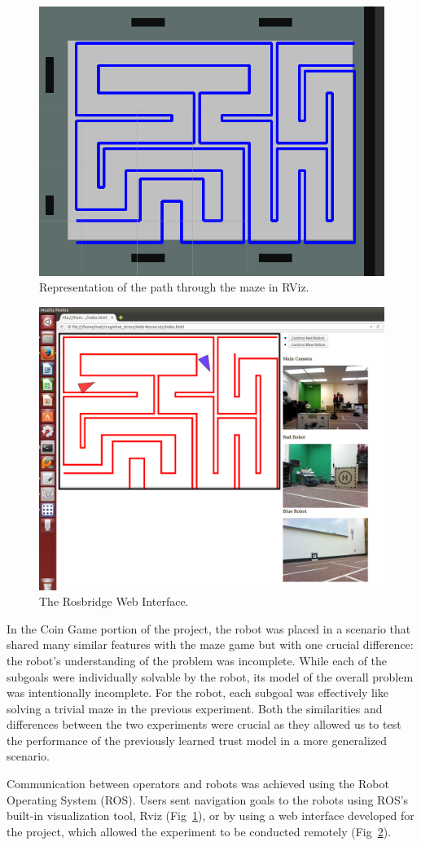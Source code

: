 \documentclass{sig-alternate}
\begin{document}
\begin{figure}
\centering 
\includegraphics[width=.5\textwidth]{rviz_maze.png} 
\caption{Representation of the path through the maze in RViz.}
\label{fig:rviz_map}
\end{figure}

\begin{figure}
\includegraphics[width=.5\textwidth]{web-controller.png}
\caption{The Rosbridge Web Interface.}
\label{fig:web_interface_img}
\end{figure}

In the Coin Game portion of the project, the robot was placed in a
scenario that shared many similar features with the maze game but with
one crucial difference: the robot's understanding of the problem was
incomplete. While each of the subgoals were individually solvable by
the robot, its model of the overall problem was intentionally
incomplete. For the robot, each subgoal was effectively like solving a
trivial maze in the previous experiment. Both the similarities and
differences between the two experiments were crucial as they allowed
us to test the performance of the previously learned trust model in a
more generalized scenario.

Communication between operators and robots was achieved using the
Robot Operating System (ROS)\cite{quigley2009ros}.  Users sent
navigation goals to the robots using ROS's built-in visualization
tool, Rviz (Fig~\ref{fig:rviz_map}), or by using a web interface
developed for the project, which allowed the experiment to be
conducted remotely (Fig~\ref{fig:web_interface_img}).
\end{document}
